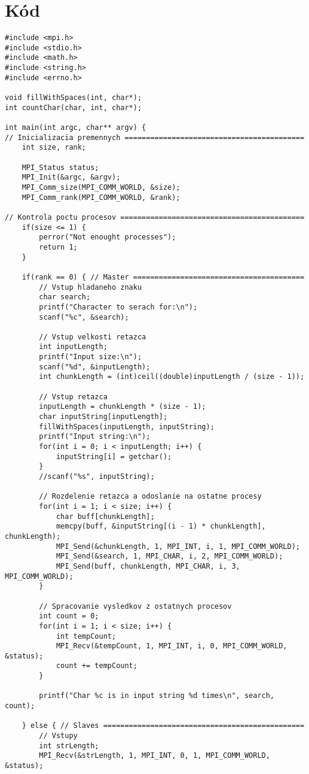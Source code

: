 \documentclass{report}
\begin{document}
\section{Kód}
\begin{lstlisting}[tabsize=4]
#include <mpi.h>
#include <stdio.h> 
#include <math.h>
#include <string.h>
#include <errno.h>

void fillWithSpaces(int, char*);
int countChar(char, int, char*);

int main(int argc, char** argv) {
// Inicializacia premennych ==========================================
	int size, rank;

	MPI_Status status;
	MPI_Init(&argc, &argv);
	MPI_Comm_size(MPI_COMM_WORLD, &size);
	MPI_Comm_rank(MPI_COMM_WORLD, &rank); 

// Kontrola poctu procesov ===========================================
	if(size <= 1) {
		perror("Not enought processes");
		return 1;
	}

	if(rank == 0) { // Master ========================================
		// Vstup hladaneho znaku
		char search;
		printf("Character to serach for:\n");
		scanf("%c", &search);

		// Vstup velkosti retazca
		int inputLength;
		printf("Input size:\n");
		scanf("%d", &inputLength);
		int chunkLength = (int)ceil((double)inputLength / (size - 1));

		// Vstup retazca
		inputLength = chunkLength * (size - 1);
		char inputString[inputLength];
		fillWithSpaces(inputLength, inputString);
		printf("Input string:\n");
		for(int i = 0; i < inputLength; i++) {
			inputString[i] = getchar();
		}
		//scanf("%s", inputString);

		// Rozdelenie retazca a odoslanie na ostatne procesy
		for(int i = 1; i < size; i++) {
			char buff[chunkLength];
			memcpy(buff, &inputString[(i - 1) * chunkLength], chunkLength);
			MPI_Send(&chunkLength, 1, MPI_INT, i, 1, MPI_COMM_WORLD);
			MPI_Send(&search, 1, MPI_CHAR, i, 2, MPI_COMM_WORLD);
			MPI_Send(buff, chunkLength, MPI_CHAR, i, 3, MPI_COMM_WORLD);
		}

		// Spracovanie vysledkov z ostatnych procesov
		int count = 0;
		for(int i = 1; i < size; i++) {
			int tempCount;
			MPI_Recv(&tempCount, 1, MPI_INT, i, 0, MPI_COMM_WORLD, &status);
			count += tempCount;
		}

		printf("Char %c is in input string %d times\n", search, count);

	} else { // Slaves ===============================================
		// Vstupy
		int strLength;	
		MPI_Recv(&strLength, 1, MPI_INT, 0, 1, MPI_COMM_WORLD, &status);


\end{lstlisting}
\end{document}
